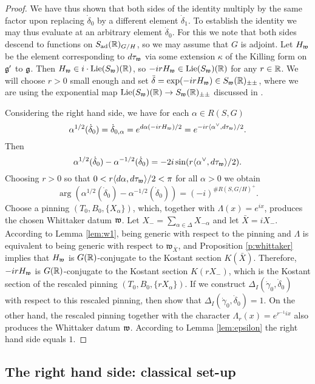 \documentclass{article}
\theoremstyle{definition}
\numberwithin{equation}{section}
\renewcommand{\-}{\hyp{}}
\newcommand{\w}{\mathfrak w}
\begin{document}
\begin{proof}
We have thus shown that both sides of the identity multiply by the same factor upon replacing $\dot\delta_0$ by a different element $\dot\delta_1$. To establish the identity we may thus evaluate at an arbitrary element $\dot\delta_0$. For this we note that both sides descend to functions on $S_{\textrm{ad}}(\mathbb{R})_{G/H}$, so we may assume that $G$ is adjoint. Let $H_{\mathfrak{w}}$ be the element corresponding to $d\tau_{\mathfrak{w}}$ via some extension $\kappa$ of the Killing form on $\mathfrak{g}'$ to $\mathfrak{g}$. Then $H_{\mathfrak{w}} \in i\cdot \textrm{Lie}(S_{\mathfrak{w}})(\mathbb{R})$, so $-irH_{\mathfrak{w}} \in \textrm{Lie}(S_{\mathfrak{w}})(\mathbb{R})$ for any $r \in \mathbb{R}$. We will choose $r>0$ small enough and set $\ddot\delta=\exp(-irH_{\mathfrak{w}}) \in S_{\mathfrak{w}}(\mathbb{R})_{\pm\pm}$, where we are using the exponential map $\textrm{Lie}(S_{\mathfrak{w}})(\mathbb{R}) \to S_{\mathfrak{w}}(\mathbb{R})_{\pm\pm}$ discussed in \cite[\S3.7]{KalDC}.



Considering the right hand side, we have for each $\alpha \in R(S,G)$
\[ \alpha^{1/2}(\dot\delta_0)=\dot\delta_{0,\alpha} = e^{d\alpha(-irH_{\mathfrak{w}})/2}=e^{-ir\langle\alpha^\vee,d\tau_{\mathfrak{w}}\rangle/2}.\]
Then
\[ \alpha^{1/2}(\dot\delta_0)-\alpha^{-1/2}(\dot\delta_0) = -2i\sin(r\langle\alpha^\vee,d\tau_{\mathfrak{w}}\rangle/2). \]
Choosing $r>0$ so that $0<r\langle d\alpha,d\tau_{\mathfrak{w}}\rangle/2 < \pi$ for all $\alpha>0$ we obtain
\[ \arg(\alpha^{1/2}(\dot\delta_0) - \alpha^{-1/2}(\dot\delta_0)) = (-i)^{\#R(S,G/H)^+}. \]
Choose a pinning $(T_0,B_0,\{X_\alpha\})$, which, together with $\Lambda(x)=e^{ix}$, produces the chosen Whittaker datum $\mathfrak{w}$. Let $X_-=\sum_{\alpha \in \Delta} X_{-\alpha}$ and let $\bar X=i X_-$. According to Lemma \ref{lem:w1}, being generic with respect to the pinning and $\Lambda$ is equivalent to being generic with respect to $\w_{\bar X}$, and Proposition \ref{p:whittaker} implies that $H_{\mathfrak{w}}$ is $G(\mathbb{R})$-conjugate to the Kostant section $K(\bar X)$. Therefore, $-irH_{\mathfrak{w}}$ is $G(\mathbb{R})$-conjugate to the Kostant section $K(rX_-)$, which is the Kostant section of the rescaled pinning $(T_0,B_0,\{rX_\alpha\})$. If we construct $\Delta_I(\dot\gamma_0,\dot\delta_0)$ with respect to this rescaled pinning, then \cite[Lemma 4.1.4]{KalHDC} show that $\Delta_I(\dot\gamma_0,\dot\delta_0)=1$. On the other hand, the rescaled pinning together with the character $\Lambda_r(x)=e^{r^{-1} i x}$ also produces the Whittaker datum $\mathfrak{w}$. According to Lemma \ref{lem:epsilon} the right hand side equals $1$.
\end{proof}

\subsection{The right hand side: classical set-up}
\end{document}
